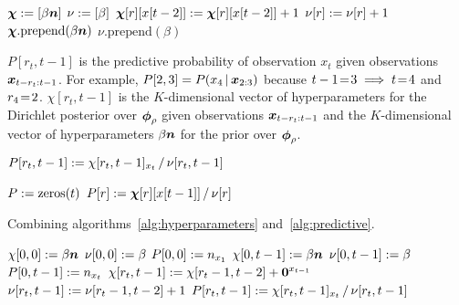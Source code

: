 \documentclass[10pt,english,oneside]{article}
\begin{document}
\begin{algorithm}[t]
  \caption[]{}
  \label{alg:hyperparameters2}
  \begin{algorithmic}[0]
    \State {}
    \Statex
    \State $\boldsymbol{\chi} := [\beta \boldsymbol{n} ]$
    \State $\nu := [\beta]$
    \Statex
    \State {}
    \Statex
    \State $\boldsymbol{\chi}[r][x[t-2]] :=
    \boldsymbol{\chi}[r][x[t-2]] + 1$
    \State $\nu[r] := \nu[r] + 1$
    \EndFor
    \State $\boldsymbol{\chi}.\textrm{prepend}(\beta \boldsymbol{n})$
    \State $\nu.\textrm{prepend}(\beta)$
    \EndFor
  \end{algorithmic}
\end{algorithm}

\begin{algorithm}[t]
  \caption[]{$P[r_t,t-1]$ is the predictive probability of observation
    $x_t$ given observations $\boldsymbol{x}_{t-r_t:t-1}$. For example, $P[2,3] =
    P(x_4 \,|\, \boldsymbol{x}_{2:3})$ because $t -1 \!=\! 3 \implies t \!=\! 4$ and
    $r_4 \!=\! 2$.  $\chi[r_t,t-1]$ is the $K$-dimensional vector of
    hyperparameters for the Dirichlet posterior over $\boldsymbol{\phi}_{\rho}$
    given observations $\boldsymbol{x}_{t-r_t:t-1}$ and the $K$-dimensional
    vector of hyperparameters $\beta \boldsymbol{n}$ for the prior over
    $\boldsymbol{\phi}_{\rho}$.}
  \label{alg:predictive}
  \begin{algorithmic}[0]
    \State $P[r_t,t-1] := \chi[r_t,t-1]_{x_t} \,/\, \nu[r_t,t-1]$
    \EndFor
    \EndFor
  \end{algorithmic}
\end{algorithm}

\begin{algorithm}[t]
  \caption[]{}
  \label{alg:predictive2}
  \begin{algorithmic}[0]
    \State $P := \textrm{zeros}(t)$
    \State $P[r] := \boldsymbol{\chi}[r][x[t-1]] \,/\, \nu[r]$
    \EndFor
    \EndFor
  \end{algorithmic}
\end{algorithm}

\begin{algorithm}[t]
  \caption[]{Combining algorithms~\ref{alg:hyperparameters}
    and~\ref{alg:predictive}.}
  \begin{algorithmic}[0]
    \State {}
    \Statex
    \State $\chi[0,0] := \beta \boldsymbol{n}$
    \State $\nu[0,0] := \beta$
    \State $P[0,0] := n_{x_1}$
    \Statex
    \State {}
    \Statex
    \State $\chi[0,t-1] := \beta \boldsymbol{n}$
    \State $\nu[0,t-1] := \beta$
    \State $P[0,t-1] := n_{x_t}$
    \State $\chi[r_t,t-1] := \chi[r_t-1,t-2] + \boldsymbol{0}^{x_{t-1}}$
    \State $\nu[r_t,t-1] := \nu[r_t-1,t-2] + 1$
    \State $P[r_t,t-1] := \chi[r_t, t-1]_{x_t} \,/\, \nu[r_t,t-1]$
    \EndFor
    \EndFor
  \end{algorithmic}
\end{algorithm}
\end{document}
